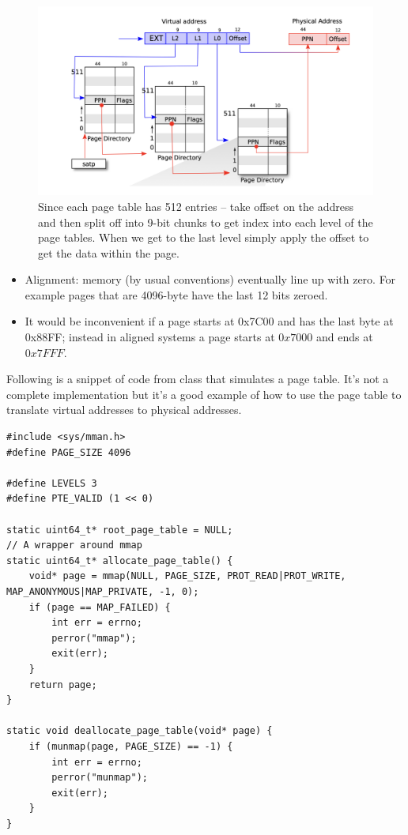 \documentclass[../notes.tex]{subfiles}
\begin{document}
\begin{figure}[H]
    \centering
    \includegraphics[width=0.8\linewidth]{img/image_2023-02-08-15-50-17.png}
    \caption{Since each page table has 512 entries -- take offset on the address and then split off into 9-bit chunks to get index into each level of the page tables. When we get to the last level simply apply the offset to get the data within the page.}
\end{figure}


\begin{itemize}
    \item Alignment: memory (by usual conventions) eventually line up with zero. For example pages that are 4096-byte have the last 12 bits zeroed.
    \item It would be inconvenient if a page starts at 0x7C00 and has the last byte at 0x88FF; instead in aligned systems a page starts at $ 0x7000 $ and ends at $ 0x7FFF $. 
\end{itemize}



Following is a snippet of code from class that simulates a page table. It's not a complete implementation but it's a good example of how to use the page table to translate virtual addresses to physical addresses.

\begin{listing}[H]
\begin{verbatim}
#include <sys/mman.h>
#define PAGE_SIZE 4096

#define LEVELS 3
#define PTE_VALID (1 << 0)

static uint64_t* root_page_table = NULL;
// A wrapper around mmap
static uint64_t* allocate_page_table() {
    void* page = mmap(NULL, PAGE_SIZE, PROT_READ|PROT_WRITE, MAP_ANONYMOUS|MAP_PRIVATE, -1, 0);
    if (page == MAP_FAILED) {
        int err = errno;
        perror("mmap");
        exit(err);
    }
    return page;
}

static void deallocate_page_table(void* page) {
    if (munmap(page, PAGE_SIZE) == -1) {
        int err = errno;
        perror("munmap");
        exit(err);
    }
}
\end{verbatim}
\end{listing}
\end{document}
